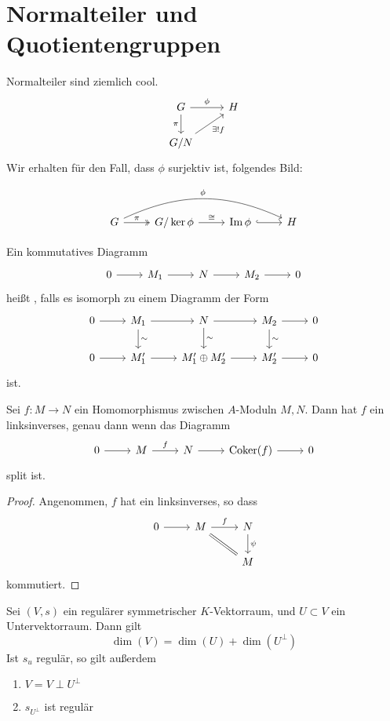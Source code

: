 \documentclass[11pt,twoside]{memoir}
\begin{document}
\section{Normalteiler und Quotientengruppen}
\begin{prop}\label{trialprop}
	Normalteiler sind ziemlich cool.
	\[
	\begin{tikzcd}
	G \ar{r}{\phi} \ar[swap]{d}{\pi} & H\\
	G/N \ar[swap]{ur}{\exists! f}
	\end{tikzcd}
	\]
	Wir erhalten für den Fall, dass $\phi$ surjektiv ist, folgendes Bild:

	\[
	\begin{tikzcd}
	G \ar[\surarr]{r}{\pi}  \ar[bend left = 25]{rrr}{\phi}& G/\ker\phi \ar{r}{\cong} & \im \phi \ar[\embarr]{r}{} & H
	\end{tikzcd}
	\]
\end{prop}
\lec
\begin{defn}
	Ein kommutatives Diagramm
	\[
	\begin{tikzcd}
	0\ar{r}&M_1\ar{r}&N\ar{r}&M_2\ar{r}&0
	\end{tikzcd}
	\]
	heißt , falls es isomorph zu einem Diagramm der Form
	\[
	\begin{tikzcd}
	0\ar{r}&M_1\ar{r}\ar{d}{\sim}&N\ar{r}\ar{d}{\sim}&M_2\ar{r}\ar{d}{\sim}&0\\
	0\ar{r}&M_1'\ar{r}&M_1'\oplus M_2'\ar{r}&M_2'\ar{r}&0
	\end{tikzcd}
	\]
	ist.
\end{defn}
\begin{prop}
	Sei $f\colon M\to N$ ein Homomorphismus zwischen $A$-Moduln $M,N$. Dann hat $f$ ein linksinverses, genau dann wenn das Diagramm
	\[
	\begin{tikzcd}
	0\ar{r}& M \ar{r}{f}& N\ar{r}&\mathrm{Coker}(f)\ar{r}&0
	\end{tikzcd}
	\]
	split ist.
\end{prop}
\begin{proof}
	Angenommen, $f$ hat ein linksinverses, so dass 
	\[
	\begin{tikzcd}
	0\ar{r}&M\ar{r}{f}\ar[swap,equal]{dr}&N\ar{d}{\psi}\\
			&&M
	\end{tikzcd}
	\]
	kommutiert.
\end{proof}
\begin{thm}
	Sei $(V,s)$ ein regulärer symmetrischer $K$-Vektorraum, und $U\subset V$ ein Untervektorraum. Dann gilt
	\[\dim(V) = \dim(U) + \dim(U^{\perp})\]
	Ist $s_u$ regulär, so gilt außerdem 
	\begin{enumerate}
		\item $V = V \perp U^{\perp}$
		\item $s_{U^{\perp}}$ ist regulär
	\end{enumerate}
\end{thm}
\end{document}
